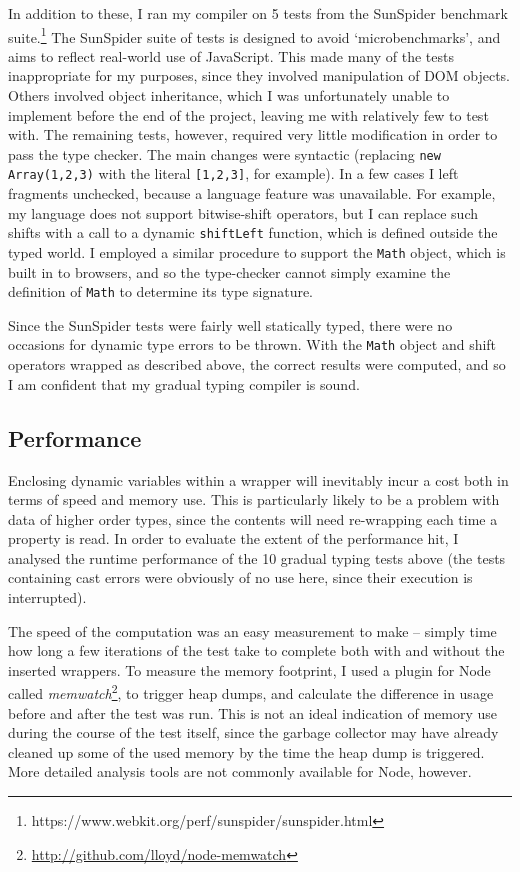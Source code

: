 \documentclass[12pt,a4paper,twoside,openright]{report}
\theoremstyle{definition}
\theoremstyle{dotless}
\newcommand*{\js}{\texttt}
\begin{document}
In addition to these, I ran my compiler on 5 tests from the SunSpider benchmark
suite.\footnote{https://www.webkit.org/perf/sunspider/sunspider.html} The
SunSpider suite of tests is designed to avoid `microbenchmarks', and aims to
reflect real-world use of JavaScript. This made many of the tests 
inappropriate for my purposes, since they involved manipulation of DOM objects.
Others involved object inheritance, which I was unfortunately unable to
implement before the end of the project, leaving me with relatively few to test
with. The remaining tests, however, required very little modification in order
to pass the type checker. The main
changes were syntactic (replacing \js{new Array(1,2,3)} with the literal
\js{[1,2,3]}, for example). In a few cases I left fragments unchecked, because
a language feature was unavailable. For example, my language does not
support bitwise-shift operators, but I can replace such shifts with a call to a
dynamic \js{shiftLeft} function, which is defined outside the typed world. I
employed a similar procedure to support the \js{Math} object, which is built in
to browsers, and so the type-checker cannot simply examine the definition of
\js{Math} to determine its type signature.

Since the SunSpider tests were fairly well statically typed, there were no
occasions for dynamic type errors to be thrown. With the \js{Math} object
and shift operators wrapped as described above, the correct results were
computed, and so I am confident that my gradual typing compiler is
sound.

\subsection*{Performance}

Enclosing dynamic variables within a wrapper will inevitably incur a cost both in
terms of speed and memory use. This is particularly likely to be a
problem with data of higher order types, since the contents will need
re-wrapping each time a property is read. In order to evaluate the
extent of the performance hit, I analysed the runtime performance of the 10
gradual typing tests above (the tests containing cast errors were obviously
of no use here, since their execution is interrupted).

The speed of the computation was an easy measurement to make -- simply time how
long a few iterations of the test take to complete both with and without the
inserted wrappers. To measure the memory footprint, I used a plugin for Node
called \textit{memwatch}\footnote{\href{http://github.com/lloyd/node-memwatch}{http://github.com/lloyd/node-memwatch}},
to trigger heap dumps, and calculate the
difference in usage before and after the test was run. This is not an ideal
indication of memory use during the course of the test itself, since the
garbage collector may have already cleaned up some of the used memory by the
time the heap dump is triggered. More detailed analysis tools are not 
commonly available for Node, however.
\end{document}
